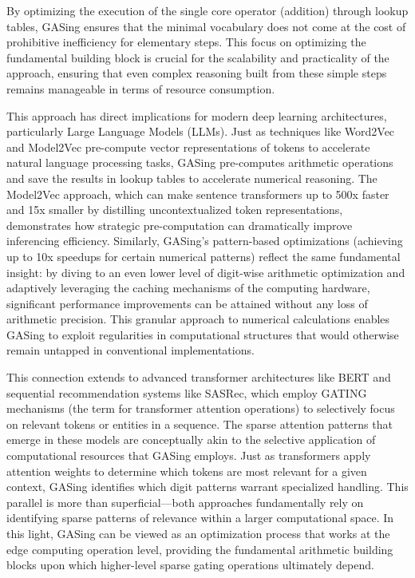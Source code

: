\documentclass[11pt,a4paper]{article}
\begin{document}
By optimizing the execution of the single core operator (addition) through lookup tables, GASing ensures that the minimal vocabulary does not come at the cost of prohibitive inefficiency for elementary steps. This focus on optimizing the fundamental building block is crucial for the scalability and practicality of the approach, ensuring that even complex reasoning built from these simple steps remains manageable in terms of resource consumption.

This approach has direct implications for modern deep learning architectures, particularly Large Language Models (LLMs). Just as techniques like Word2Vec and Model2Vec pre-compute vector representations of tokens to accelerate natural language processing tasks, GASing pre-computes arithmetic operations and save the results in lookup tables to accelerate numerical reasoning. The Model2Vec approach, which can make sentence transformers up to 500x faster and 15x smaller by distilling uncontextualized token representations, demonstrates how strategic pre-computation can dramatically improve inferencing efficiency. Similarly, GASing's pattern-based optimizations (achieving up to 10x speedups for certain numerical patterns) reflect the same fundamental insight: by diving to an even lower level of digit-wise arithmetic optimization and adaptively leveraging the caching mechanisms of the computing hardware, significant performance improvements can be attained without any loss of arithmetic precision. This granular approach to numerical calculations enables GASing to exploit regularities in computational structures that would otherwise remain untapped in conventional implementations.

This connection extends to advanced transformer architectures like BERT and sequential recommendation systems like SASRec, which employ GATING mechanisms (the term for transformer attention operations) to selectively focus on relevant tokens or entities in a sequence. The sparse attention patterns that emerge in these models are conceptually akin to the selective application of computational resources that GASing employs. Just as transformers apply attention weights to determine which tokens are most relevant for a given context, GASing identifies which digit patterns warrant specialized handling. This parallel is more than superficial—both approaches fundamentally rely on identifying sparse patterns of relevance within a larger computational space. In this light, GASing can be viewed as an optimization process that works at the edge computing operation level, providing the fundamental arithmetic building blocks upon which higher-level sparse gating operations ultimately depend.
\end{document}
